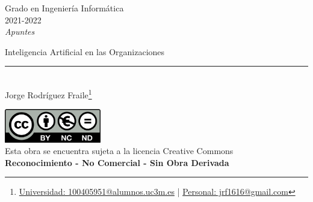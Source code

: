 \documentclass[12pt, twoside, openright]{report} %
\begin{document}

\begin{titlepage}
	\begin{sffamily}
		\color{azulUC3M}
		\begin{center}
			\begin{figure}[H] %
			\end{figure}
			\vspace{2.5cm}
			\begin{Large}
				Grado en Ingeniería Informática\\
				2021-2022\\
				\vspace{2cm}
				\textsl{Apuntes}\\
				\bigskip
			\end{Large}
			{\Huge Inteligencia Artificial en las Organizaciones}\\
			\vspace*{0.5cm}
			\rule{10.5cm}{0.1mm}\\
			\vspace*{0.9cm}
			{\LARGE Jorge Rodríguez Fraile\footnote{\href{mailto:100405951@alumnos.uc3m.es}{Universidad: 100405951@alumnos.uc3m.es}  |  \href{mailto:jrf1616@gmail.com}{Personal: jrf1616@gmail.com}}}\\
			\vspace*{1cm}
		\end{center}
		\vfill
		\color{black}
		\includegraphics[width=4.2cm]{img/creativecommons.png}\\
		Esta obra se encuentra sujeta a la licencia Creative Commons\\ \textbf{Reconocimiento - No Comercial - Sin Obra Derivada}
	\end{sffamily}
\end{titlepage}


\tableofcontents
\thispagestyle{fancy}
\end{document}
